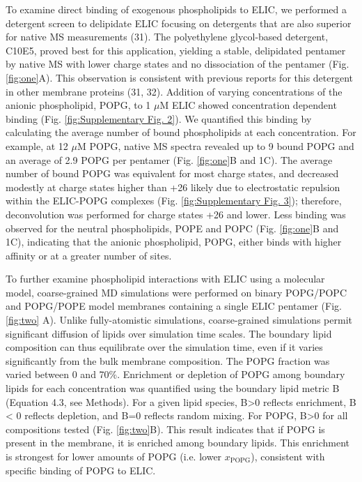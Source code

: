 To examine direct binding of exogenous phospholipids to ELIC, we performed
a detergent screen to delipidate ELIC focusing on detergents that are
also superior for native MS measurements (31). The polyethylene
glycol-based detergent, C10E5, proved best for this application,
yielding a stable, delipidated pentamer by native MS with lower charge
states and no dissociation of the pentamer (Fig. \ref{fig:one}A). This observation
is consistent with previous reports for this detergent in other membrane
proteins (31, 32). Addition of varying concentrations of the anionic
phospholipid, POPG, to 1 $\mu$M ELIC showed concentration dependent binding
(Fig. \ref{fig:Supplementary Fig. 2}). We quantified this binding by calculating the
average number of bound phospholipids at each concentration. For
example, at 12 $\mu$M POPG, native MS spectra revealed up to 9 bound POPG
and an average of 2.9 POPG per pentamer (Fig. \ref{fig:one}B and 1C). The average
number of bound POPG was equivalent for most charge states, and
decreased modestly at charge states higher than +26 likely due to
electrostatic repulsion within the ELIC-POPG complexes (Fig. \ref{fig:Supplementary
Fig. 3}); therefore, deconvolution was performed for charge states +26
and lower. Less binding was observed for the neutral phospholipids, POPE
and POPC (Fig. \ref{fig:one}B and 1C), indicating that the anionic phospholipid,
POPG, either binds with higher affinity or at a greater number of sites.

To further examine phospholipid interactions with ELIC using a molecular
model, coarse-grained MD simulations were performed on binary POPG/POPC
and POPG/POPE model membranes containing a single ELIC pentamer (Fig.
\ref{fig:two} A). Unlike fully-atomistic simulations, coarse-grained simulations
permit significant diffusion of lipids over simulation time scales. The
boundary lipid composition can thus equilibrate over the simulation
time, even if it varies significantly from the bulk membrane
composition. The POPG fraction was varied between 0 and 70\%. Enrichment
or depletion of POPG among boundary lipids for each concentration was
quantified using the boundary lipid metric B (Equation 4.3, see Methods).
For a given lipid species, B\textgreater{}0 reflects enrichment, B
\textless{} 0 reflects depletion, and B=0 reflects random mixing. For
POPG, B\textgreater{}0 for all compositions tested (Fig. \ref{fig:two}B). This
result indicates that if POPG is present in the membrane, it is enriched
among boundary lipids. This enrichment is strongest for lower amounts of
POPG (i.e. lower \(x_{\text{POPG}}\)), consistent with specific binding
of POPG to ELIC.

